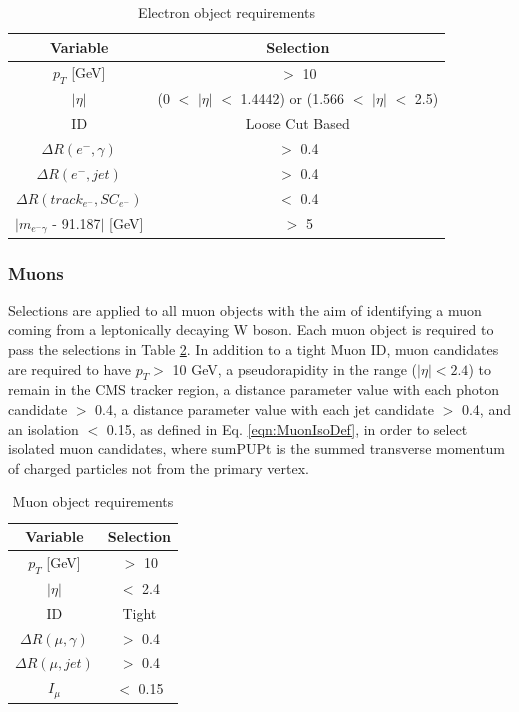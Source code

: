 \begin{table}[H]
    \begin{center}
        \begin{tabular}{c|c}
        Variable & Selection \\ \hline
        $p_{T}$ [GeV] & $>$ 10 \\
        $|\eta|$ & (0 $<$ $|\eta|$ $<$ 1.4442) or (1.566 $<$ $|\eta|$ $<$ 2.5) \\
        ID & Loose Cut Based \\
        $\Delta R(e^{-},\gamma)$ & $>$ 0.4 \\
        $\Delta R(e^{-},jet)$ & $>$ 0.4 \\
        $\Delta R(track_{e^{-}},SC_{e^{-}})$ & $<$ 0.4 \\
        $|m_{e^{-}\gamma}$ - 91.187$|$ [GeV] & $>$ 5
        \end{tabular}
    \end{center}
    \caption{
        Electron object requirements
    }
    \label{tab:ElectronSelections}
\end{table}

\subsubsection{Muons}

Selections are applied to all muon objects with the aim of identifying a muon coming from a leptonically decaying W boson. Each muon object is required to pass
the selections in Table \ref{tab:MuonSelections}. In addition to a tight Muon ID, muon candidates are required to have $p_{T} > $ 10 GeV, a pseudorapidity in the range ($|\eta| < 2.4$) to remain in the CMS tracker region, a distance parameter value with each photon candidate $>$ 0.4, a 
distance parameter value with each jet candidate $>$ 0.4, and an isolation $<$ 0.15, as defined in Eq. \ref{eqn:MuonIsoDef}, in order to select isolated muon candidates, where sumPUPt is the summed transverse momentum of charged particles not from the primary vertex.

\begin{table}[H]
    \begin{center}
        \begin{tabular}{c|c}
        Variable & Selection \\ \hline
        $p_{T}$ [GeV] & $>$ 10 \\
        $|\eta|$ & $<$ 2.4 \\
        ID & Tight \\
        $\Delta R(\mu,\gamma)$ & $>$ 0.4 \\
        $\Delta R(\mu,jet)$ & $>$ 0.4 \\
        $I_{\mu}$ & $<$ 0.15
        \end{tabular}
    \end{center}
    \caption{
        Muon object requirements
    }
    \label{tab:MuonSelections}
\end{table}

